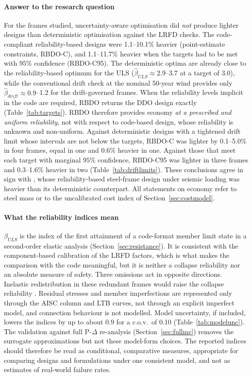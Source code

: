 \paragraph{Answer to the research question}
For the frames studied, uncertainty-aware optimisation did \emph{not} produce lighter designs than
deterministic optimisation against the LRFD checks. The code-compliant reliability-based designs
were 1.1--10.1\% heavier (point-estimate constraints, RBDO-C), and 1.1--11.7\% heavier when the targets
had to be met with $95\%$ confidence (RBDO-C95). The deterministic optima are already close to the reliability-based
optimum for the ULS ($\hat\beta_{ULS}\approx2.9$--3.7 at a target of 3.0), while the conventional
drift check at the nominal 50-year wind provides only $\hat\beta_{drift}\approx0.9$--1.2 for the
drift-governed frames. When the reliability levels implicit in the code are required, RBDO returns
the DDO design exactly (Table~\ref{tab:targets}). RBDO therefore provides economy \emph{at a
prescribed and uniform reliability}, not with respect to code-based design, whose reliability is
unknown and non-uniform. Against deterministic designs with a tightened drift limit whose intervals are not below the
targets, RBDO-C was lighter by 0.1--5.0\% in four frames, equal in one and 0.6\% heavier in one.
Against those that meet each target with marginal $95\%$ confidence, RBDO-C95 was lighter in three frames
and 0.3--1.6\% heavier in two (Table~\ref{tab:driftlimits}). These conclusions agree in sign
with \citet{Papadrakakis2004}, whose reliability-based steel-frame design under seismic loading was
heavier than its deterministic counterpart. All statements on economy refer to steel mass or to
the uncalibrated cost index of Section~\ref{sec:costmodel}.

\paragraph{What the reliability indices mean}
$\beta_{ULS}$ is the index of the first attainment of a code-format member limit state in a
second-order elastic analysis (Section~\ref{sec:resistance}). It is consistent with the
component-based calibration of the LRFD factors, which is what makes the comparison with the code
meaningful, but it is neither a collapse reliability nor an absolute measure of safety. Three
omissions act in opposite directions. Inelastic redistribution in these redundant frames would
raise the collapse reliability \citep{Buonopane2006,Zhang2016}. Residual stresses and member
imperfections are represented only through the AISC column and LTB curves, not through an explicit
imperfect model, and connection behaviour is not modelled. Model uncertainty, if included, lowers
the indices by up to about 0.9 for a c.o.v.\ of 0.10 (Table~\ref{tab:modelunc}). The validation
against full P-$\Delta$ re-analysis (Section~\ref{sec:fullmc}) removes the surrogate approximations
but not these model-form choices. The reported indices should therefore be read as conditional,
comparative measures, appropriate for comparing designs and formulations under one consistent
model, and not as estimates of real-world failure rates.

